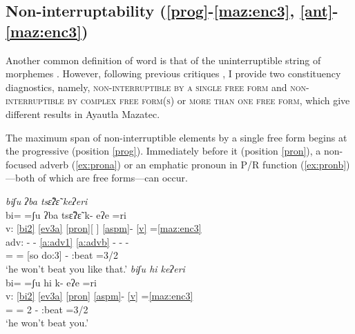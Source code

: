 \documentclass[output=paper]{langscibook}
\begin{document}
\subsection{Non-interruptability (\ref{prog}-\ref{maz:enc3}, \ref{ant}-\ref{maz:enc3})}\label{sec:d:interrupt}
Another common definition of word is that of the uninterruptible string of morphemes \citep[cf.][44]{haspelmathword:2011}. However, following previous critiques \citep[cf.][]{haspelmathword:2011,tallman2021constituency}, I provide two constituency diagnostics, namely, \textsc{non-interrup\-tible by a single free form} and \textsc{non-interruptible by complex free form(s)} or \textsc{more than one free form}, which give different results in Ayautla Mazatec.

The maximum span of non-interruptible elements by a single free form begins at the progressive (position \ref{prog}). Immediately before it (position \ref{pron}), a non-focused adverb (\ref{ex:prona}) or an emphatic pronoun in P/R function (\ref{ex:pronb})—both of which are free forms—can occur.


\ea 
 \ea \label{ex:prona} \textit{bi\4ʃu\3 ʔba\1 tsɛ̃\2\st{}ʔɛ̃\3 k\lab{}e\1\st{}ʔe\4ri\2}\\
 \gllll {} bi\4= =ʃu\3\ff{} ʔba\1 tsɛ̃\2ʔɛ̃\3\ff{} k\lab{}- e\1ʔe\4 =ri\2\\
v: \ref{bi2} \ref{ev3a} \ref{pron}[ {}] \ref{aspm}- \ref{v} =\ref{maz:enc3}\\
adv: - - \ref{a:adv1} \ref{a:advb} - - -\\
{} \Neg{}= =\Rep{} [so do:3] \Pot- \Pot:beat =3/2\Sg\\
\glt `he won't beat you like that.' 
 \ex \label{ex:pronb} \textit{bi\4ʃu\3 \st{}hi\2\3 k\lab{}e\1\st{}ʔe\4ri\2}\\
 \glll {} bi\4= =ʃu\3\ff{} hi\2\3 k\lab{}- e\1ʔe\4 =ri\2\\
v: \ref{bi2} \ref{ev3a} \ref{pron} \ref{aspm}- \ref{v} =\ref{maz:enc3}\\
{} \Neg{}= =\Rep{} \Pronom{}2\Sg{} \Pot- \Pot:beat =3/2\Sg\\
\glt `he won't beat you.' 
 \z
\z
\end{document}
